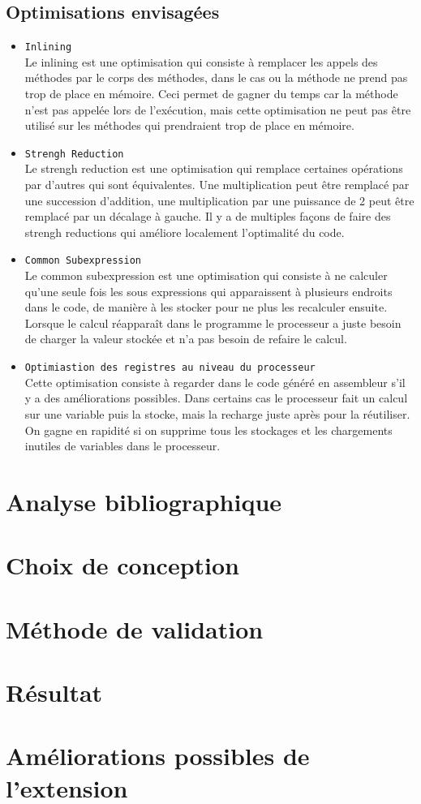 \documentclass[a4paper]{article}
\begin{document}
\subsection{Optimisations envisagées}
\begin{itemize}
\item \texttt{Inlining} \\
Le inlining est une optimisation qui consiste à remplacer les appels des méthodes par le corps des méthodes, dans le cas ou la méthode ne prend pas trop de place en mémoire. Ceci permet de gagner du temps car la méthode n'est pas appelée lors de l'exécution, mais cette optimisation ne peut pas être utilisé sur les méthodes qui prendraient trop de place en mémoire.
\item \texttt{Strengh Reduction} \\
Le strengh reduction est une optimisation qui remplace certaines opérations par d'autres qui sont équivalentes. Une multiplication peut être remplacé par une succession d'addition, une multiplication par une puissance de 2 peut être remplacé par un décalage à gauche. Il y a de multiples façons de faire des strengh reductions qui améliore localement l'optimalité du code.
\item \texttt{Common Subexpression} \\
Le common subexpression est une optimisation qui consiste à ne calculer qu'une seule fois les sous expressions qui apparaissent à plusieurs endroits dans le code, de manière à les stocker pour ne plus les recalculer ensuite. Lorsque le calcul réapparaît dans le programme le processeur a juste besoin de charger la valeur stockée et n'a pas besoin de refaire le calcul.
\item \texttt{Optimiastion des registres au niveau du processeur} \\
Cette optimisation consiste à regarder dans le code généré en assembleur s'il y a des améliorations possibles. Dans certains cas le processeur fait un calcul sur une variable puis la stocke, mais la recharge juste après pour la réutiliser. On gagne en rapidité si on supprime tous les stockages et les chargements inutiles de variables dans le processeur. 
     \end{itemize}
\section{Analyse bibliographique}
\section{Choix de conception}
\section{Méthode de validation}
\section{Résultat}
\section{Améliorations possibles de l'extension}
\end{document}
